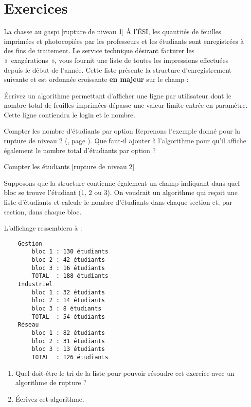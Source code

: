 \section{Exercices}


\begin{Exercice}{La chasse au gaspi [rupture de niveau 1]}
	À l’ÉSI, les quantités de feuilles imprimées et photocopiées 
	par les professeurs et les étudiants sont enregistrées à des fins de traitement.
	Le service technique désirant facturer les «~exagérations~», 
	vous fournit une liste de toutes les impressions effectuées depuis le début de l'année.
	Cette liste présente la structure d’enregistrement  suivante 
	et est ordonnée croissante \textbf{en majeur} sur le champ   :

	\begin{LDA}
		\EndStruct
	\end{LDA}

	Écrivez un algorithme permettant d'afficher une ligne par
	utilisateur dont le nombre total de feuilles imprimées dépasse une
	valeur limite entrée en paramètre. 
	Cette ligne contiendra le login et le nombre.
\end{Exercice}

\begin{Exercice}{Compter les nombre d'étudiants par option}
	Reprenons l'exemple donné pour la rupture de niveau 2 (, page \pageref{algo:rupt2}).
	Que faut-il ajouter à l'algorithme pour qu'il affiche également 
	le nombre total d'étudiants par option ?
\end{Exercice}

\begin{Exercice}{Compter les étudiants [rupture de niveau 2]}
	
	Supposons que la structure  contienne également
	un champ indiquant dans quel bloc se trouve l'étudiant (1, 2 ou 3).
	On voudrait un algorithme qui reçoit une liste d'étudiants et calcule
	le nombre d'étudiants dans chaque section et, par section, dans chaque bloc.
	
	L'affichage ressemblera à :
	{\small
	\begin{verbatim}
    Gestion
        bloc 1 : 130 étudiants
        bloc 2 : 42 étudiants
        bloc 3 : 16 étudiants
        TOTAL  : 188 étudiants
    Industriel
        bloc 1 : 32 étudiants
        bloc 2 : 14 étudiants
        bloc 3 : 8 étudiants
        TOTAL  : 54 étudiants
    Réseau
        bloc 1 : 82 étudiants
        bloc 2 : 31 étudiants
        bloc 3 : 13 étudiants
        TOTAL  : 126 étudiants
	\end{verbatim}
	}
	\begin{enumerate}[label=\alph*)]
		\item 
		Quel doit-être le tri de la liste pour pouvoir résoudre cet exercice
		avec un algorithme de rupture ?
		\item 
		Écrivez cet algorithme.
	\end{enumerate}
\end{Exercice}
	
